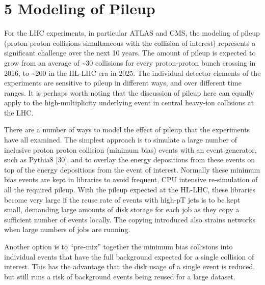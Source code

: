 \documentclass[12pt,a4paper]{article}
\begin{document}
\hypertarget{modeling-of-pileup}{%
\section{5 Modeling of Pileup}\label{modeling-of-pileup}}

For the LHC experiments, in particular ATLAS and CMS, the modeling of
pileup (proton-proton collisions simultaneous with the collision of
interest) represents a significant challenge over the next 10 years. The
amount of pileup is expected to grow from an average of
\textasciitilde{}30 collisions for every proton-proton bunch crossing in
2016, to \textasciitilde{}200 in the HL-LHC era in 2025. The individual
detector elements of the experiments are sensitive to pileup in
different ways, and over different time ranges. It is perhaps worth
noting that the discussion of pileup here can equally apply to the
high-multiplicity underlying event in central heavy-ion collisions at
the LHC.

There are a number of ways to model the effect of pileup that the
experiments have all examined. The simplest approach is to simulate a
large number of inclusive proton proton collision (minimum bias) events
with an event generator, such as Pythia8 {[}30{]}, and to overlay the
energy depositions from these events on top of the energy depositions
from the event of interest. Normally these minimum bias events are kept
in libraries to avoid frequent, CPU intensive re-simulation of all the
required pileup. With the pileup expected at the HL-LHC, these libraries
become very large if the reuse rate of events with high-pT jets is to be
kept small, demanding large amounts of disk storage for each job as they
copy a sufficient number of events locally. The copying introduced also
strains networks when large numbers of jobs are running.

Another option is to ``pre-mix'' together the minimum bias collisions
into individual events that have the full background expected for a
single collision of interest. This has the advantage that the disk usage
of a single event is reduced, but still runs a risk of background events
being reused for a large dataset.
\end{document}
